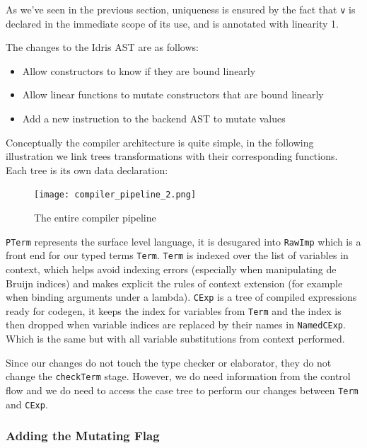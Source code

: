 \documentclass[
]{article}
\providecommand{\tightlist}{%
  \setlength{\itemsep}{0pt}\setlength{\parskip}{0pt}}
\begin{document}
As we've seen in the previous section, uniqueness is ensured by the fact
that \texttt{v} is declared in the immediate scope of its use, and is
annotated with linearity 1.

The changes to the Idris AST are as follows:

\begin{itemize}
\tightlist
\item
  Allow constructors to know if they are bound linearly
\item
  Allow linear functions to mutate constructors that are bound linearly
\item
  Add a new instruction to the backend AST to mutate values
\end{itemize}

Conceptually the compiler architecture is quite simple, in the following
illustration we link trees transformations with their corresponding
functions. Each tree is its own data declaration:

\begin{figure}
\centering
\texttt{[image: compiler\_pipeline\_2.png]}
\caption{The entire compiler pipeline}
\end{figure}

\texttt{PTerm} represents the surface level language, it is desugared
into \texttt{RawImp} which is a front end for our typed terms
\texttt{Term}. \texttt{Term} is indexed over the list of variables in
context, which helps avoid indexing errors (especially when manipulating
de Bruijn indices) and makes explicit the rules of context extension
(for example when binding arguments under a lambda). \texttt{CExp} is a
tree of compiled expressions ready for codegen, it keeps the index for
variables from \texttt{Term} and the index is then dropped when variable
indices are replaced by their names in \texttt{NamedCExp}. Which is the
same but with all variable substitutions from context performed.

Since our changes do not touch the type checker or elaborator, they do
not change the \texttt{checkTerm} stage. However, we do need information
from the control flow and we do need to access the case tree to perform
our changes between \texttt{Term} and \texttt{CExp}.

\hypertarget{adding-the-mutating-flag}{%
\subsubsection{Adding the Mutating
Flag}\label{adding-the-mutating-flag}}
\end{document}
